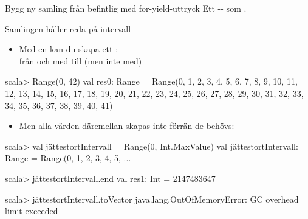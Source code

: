 \begin{Slide}{Bygg ny samling från befintlig med for-yield-uttryck}
Ett -- som .



\end{Slide}


\begin{Slide}{Samlingen  håller reda på intervall}
\begin{itemize}
\item Med en  kan du skapa ett : \\ från och med  till (men inte med) 
\end{itemize}

\begin{REPLnonum}
scala> Range(0, 42)
val res0: Range =
  Range(0, 1, 2, 3, 4, 5, 6, 7, 8, 9, 10, 11, 12, 13, 14,
    15, 16, 17, 18, 19, 20, 21, 22, 23, 24, 25, 26, 27, 28,
    29, 30, 31, 32, 33, 34, 35, 36, 37, 38, 39, 40, 41)
\end{REPLnonum}

\begin{itemize}
\item Men alla värden däremellan skapas inte förrän de behövs:
\end{itemize}

\begin{REPL}
scala> val jättestortIntervall = Range(0, Int.MaxValue)
val jättestortIntervall: Range = Range(0, 1, 2, 3, 4, 5, ...

scala> jättestortIntervall.end
val res1: Int = 2147483647

scala> jättestortIntervall.toVector
java.lang.OutOfMemoryError: GC overhead limit exceeded
\end{REPL}

\end{Slide}

